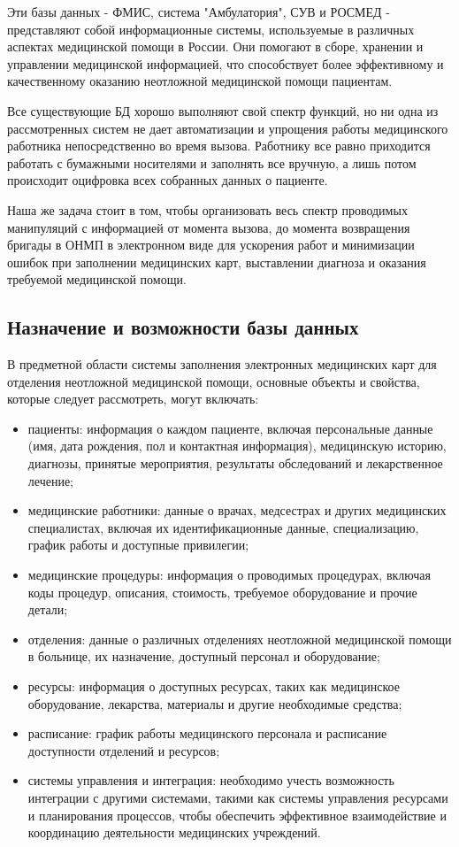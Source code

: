 Эти базы данных - ФМИС, система "Амбулатория", СУВ и РОСМЕД - представляют собой информационные системы, используемые в различных аспектах медицинской помощи в России. Они помогают в сборе, хранении и управлении медицинской информацией, что способствует более эффективному и качественному оказанию неотложной медицинской помощи пациентам.

Все существующие БД хорошо выполняют свой спектр функций, но ни одна из рассмотренных систем не дает автоматизации и упрощения работы медицинского работника непосредственно во время вызова. Работнику все равно приходится работать с бумажными носителями и заполнять все вручную, а лишь потом происходит оцифровка всех собранных данных о пациенте.

Наша же задача стоит в том, чтобы организовать весь спектр проводимых манипуляций с информацией от момента вызова, до момента возвращения бригады в ОНМП в электронном виде для ускорения работ и минимизации ошибок при заполнении медицинских карт, выставлении диагноза и оказания требуемой медицинской помощи.




\subsection{Назначение и возможности базы данных}

В предметной области системы заполнения электронных медицинских карт для отделения неотложной медицинской помощи, основные объекты и свойства, которые следует рассмотреть, могут включать:

\begin{itemize}
    \item пациенты: информация о каждом пациенте, включая персональные данные (имя, дата рождения, пол и контактная информация), медицинскую историю, диагнозы, принятые мероприятия, результаты обследований и лекарственное лечение;
    \item медицинские работники: данные о врачах, медсестрах и других медицинских специалистах, включая их идентификационные данные, специализацию, график работы и доступные привилегии;
    \item медицинские процедуры: информация о проводимых процедурах, включая коды процедур, описания, стоимость, требуемое оборудование и прочие детали;
    \item отделения: данные о различных отделениях неотложной медицинской помощи в больнице, их назначение, доступный персонал и оборудование;
    \item ресурсы: информация о доступных ресурсах, таких как медицинское оборудование, лекарства, материалы и другие необходимые средства;
    \item расписание: график работы медицинского персонала и расписание доступности отделений и ресурсов;
    \item системы управления и интеграция: необходимо учесть возможность интеграции с другими системами, такими как системы управления ресурсами и планирования процессов, чтобы обеспечить эффективное взаимодействие и координацию деятельности медицинских учреждений.
\end{itemize}

